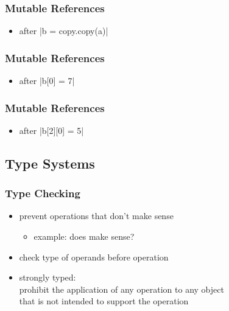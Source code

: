 \documentclass[dvipsnames]{beamer}
\theoremstyle{plain}
\begin{document}
\begin{frame}[fragile]
  \frametitle{Mutable References}

  \begin{itemize}
    \item after \pyv|b = copy.copy(a)|
  \end{itemize}

  \begin{center}
  \end{center}
\end{frame}

\begin{frame}[fragile]
  \frametitle{Mutable References}

  \begin{itemize}
    \item after \pyv|b[0] = 7|
  \end{itemize}

  \begin{center}
  \end{center}
\end{frame}

\begin{frame}[fragile]
  \frametitle{Mutable References}

  \begin{itemize}
    \item after \pyv|b[2][0] = 5|
  \end{itemize}

  \begin{center}
  \end{center}
\end{frame}

\subsection{Type Systems}

\begin{frame}
  \frametitle{Type Checking}

  \begin{itemize}
    \item prevent operations that don't make sense
    \begin{itemize}
      \item example: does  make sense?
    \end{itemize}
    \item check type of operands before operation

    \pause
    \medskip
    \item \alert{strongly typed}:\\
      prohibit the application of any operation to any object\\
      that is not intended to support the operation
  \end{itemize}
\end{frame}
\end{document}
